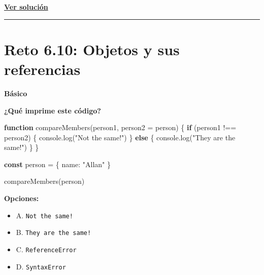 \documentclass[
  letterpaper,
  DIV=11,
  numbers=noendperiod]{scrreprt}
\newenvironment{Shaded}{\begin{snugshade}}{\end{snugshade}}
\newcommand{\BuiltInTok}[1]{\textcolor[rgb]{0.00,0.23,0.31}{#1}}
\newcommand{\ControlFlowTok}[1]{\textcolor[rgb]{0.00,0.23,0.31}{\textbf{#1}}}
\newcommand{\DataTypeTok}[1]{\textcolor[rgb]{0.68,0.00,0.00}{#1}}
\newcommand{\FunctionTok}[1]{\textcolor[rgb]{0.28,0.35,0.67}{#1}}
\newcommand{\KeywordTok}[1]{\textcolor[rgb]{0.00,0.23,0.31}{\textbf{#1}}}
\newcommand{\NormalTok}[1]{\textcolor[rgb]{0.00,0.23,0.31}{#1}}
\newcommand{\OperatorTok}[1]{\textcolor[rgb]{0.37,0.37,0.37}{#1}}
\newcommand{\StringTok}[1]{\textcolor[rgb]{0.13,0.47,0.30}{#1}}
\providecommand{\tightlist}{%
  \setlength{\itemsep}{0pt}\setlength{\parskip}{0pt}}
\begin{document}
\textbf{\hyperref[sec-sol-cap6-reto9]{Ver solución}}

\begin{center}\rule{0.5\linewidth}{0.5pt}\end{center}

\section{Reto 6.10: Objetos y sus referencias}\label{sec-cap6-reto10}

\begin{tcolorbox}[enhanced jigsaw, left=2mm, toprule=.15mm, leftrule=.75mm, breakable, colback=white, coltitle=black, bottomtitle=1mm, arc=.35mm, rightrule=.15mm, colframe=quarto-callout-caution-color-frame, opacitybacktitle=0.6, toptitle=1mm, opacityback=0, titlerule=0mm, title=\textcolor{quarto-callout-caution-color}{\faFire}\hspace{0.5em}{Dificultad}, bottomrule=.15mm, colbacktitle=quarto-callout-caution-color!10!white]

\textbf{Básico}

\end{tcolorbox}

\textbf{¿Qué imprime este código?}

\begin{Shaded}
\begin{Highlighting}[]
\KeywordTok{function} \FunctionTok{compareMembers}\NormalTok{(person1}\OperatorTok{,}\NormalTok{ person2 }\OperatorTok{=}\NormalTok{ person) \{}
  \ControlFlowTok{if}\NormalTok{ (person1 }\OperatorTok{!==}\NormalTok{ person2) \{}
    \BuiltInTok{console}\OperatorTok{.}\FunctionTok{log}\NormalTok{(}\StringTok{"Not the same!"}\NormalTok{)}
\NormalTok{  \} }\ControlFlowTok{else}\NormalTok{ \{}
    \BuiltInTok{console}\OperatorTok{.}\FunctionTok{log}\NormalTok{(}\StringTok{"They are the same!"}\NormalTok{)}
\NormalTok{  \}}
\NormalTok{\}}

\KeywordTok{const}\NormalTok{ person }\OperatorTok{=}\NormalTok{ \{ }\DataTypeTok{name}\OperatorTok{:} \StringTok{"Allan"}\NormalTok{ \}}

\FunctionTok{compareMembers}\NormalTok{(person)}
\end{Highlighting}
\end{Shaded}

\textbf{Opciones:}

\begin{itemize}
\tightlist
\item
  A. \texttt{Not\ the\ same!}
\item
  B. \texttt{They\ are\ the\ same!}
\item
  C. \texttt{ReferenceError}
\item
  D. \texttt{SyntaxError}
\end{itemize}
\end{document}
